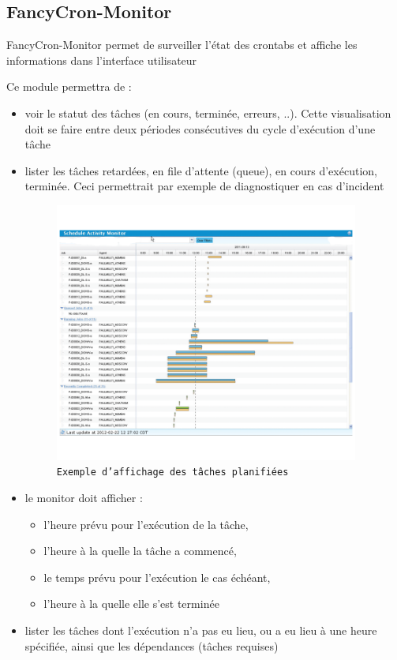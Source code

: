 \documentclass{bouygues-fr}
\begin{document}
\subsection{FancyCron-Monitor}
FancyCron-Monitor permet de surveiller l'état des crontabs et affiche les informations dans l'interface utilisateur 

Ce module permettra de : 
\begin{itemize}
\item voir le statut des tâches (en cours, terminée, erreurs, ..). Cette visualisation doit se faire entre deux périodes consécutives du cycle d'exécution d'une tâche
\item lister les tâches retardées, en file d'attente (queue), en cours d'exécution, terminée. Ceci permettrait par exemple de diagnostiquer en cas d'incident
 \begin{figure}[H]
    \begin{center}
      \includegraphics[width=10cm]{sam.png}
    \end{center}
    \caption{\scriptsize \texttt{Exemple d'affichage des tâches planifiées}}
  \end{figure}
\item le monitor doit afficher :
\begin{itemize}
\item l'heure prévu pour l'exécution de la tâche,
\item l'heure à la quelle la tâche a commencé,
\item le temps prévu pour l'exécution le cas échéant,
\item l'heure à la quelle elle s'est terminée
\end{itemize}
\item lister les tâches dont l'exécution n'a pas eu lieu, ou a eu lieu à une heure spécifiée, ainsi que les dépendances (tâches requises)

\end{itemize}
\end{document}
